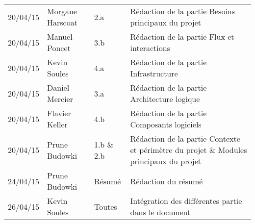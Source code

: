 \small
\begin{tabular}{|p{1.7cm}| >{\raggedright}p{2.6cm}| >{\raggedright}p{3.2cm}|p{7.7cm}|}
  \hline
  \rowcolor{Gainsboro} \color{Navy}{\bfseries Date}  & \color{Navy}{\bfseries Auteur} & \color{Navy}{\bfseries Section(s)}  &\color{Navy}{\bfseries Commentaires} \\
  \hline
  20/04/15 & Morgane Harscoat & 2.a & Rédaction de la partie Besoins principaux du projet\\
  \hline
  20/04/15 & Manuel Poncet & 3.b & Rédaction de la partie Flux et interactions \\
  \hline
  20/04/15 & Kevin Soules & 4.a & Rédaction de la partie Infrastructure\\
  \hline
  20/04/15 & Daniel Mercier & 3.a & Rédaction de la partie Architecture logique\\
  \hline
  20/04/15 & Flavier Keller & 4.b & Rédaction de la partie Composants logiciels \\
  \hline
  20/04/15 & Prune Budowki & 1.b \& 2.b & Rédaction de la partie Contexte et périmètre du projet \& Modules principaux du projet\\
  \hline
  24/04/15 & Prune Budowki & Résumé & Rédaction du résumé\\
  \hline
  26/04/15 & Kevin Soules & Toutes & Intégration des différentes partie dans le document\\
  \hline
\end{tabular}
\normalsize
